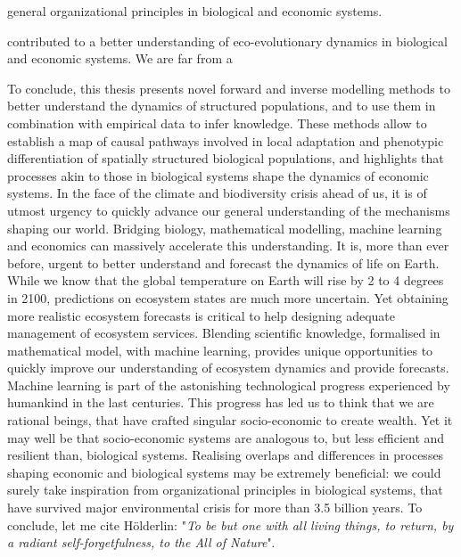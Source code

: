 general organizational principles in biological and economic systems.


contributed to a better understanding of eco-evolutionary dynamics in biological and economic systems.
% 
We are far from a 

To conclude, this thesis presents novel forward and inverse modelling methods to better understand the dynamics of structured populations, and to use them in combination with empirical data to infer knowledge. These methods allow to establish a map of causal pathways involved in local adaptation and phenotypic differentiation of spatially structured biological populations, and highlights that processes akin to those in biological systems shape the dynamics of economic systems. 
% 
In the face of the climate and biodiversity crisis ahead of us, it is of utmost urgency to quickly advance our general understanding of the mechanisms shaping our world.
% 
Bridging biology, mathematical modelling, machine learning and economics can massively accelerate this understanding.
It is, more than ever before, urgent to better understand and forecast the dynamics of life on Earth.
% 
While we know that the global temperature on Earth will rise by 2 to 4 degrees in 2100, predictions on ecosystem states are much more uncertain. Yet obtaining more realistic ecosystem forecasts is critical to help designing adequate management of ecosystem services.
% 
Blending scientific knowledge, formalised in mathematical model, with machine learning, provides unique opportunities to quickly improve our understanding of ecosystem dynamics and provide forecasts. %
% 
Machine learning is part of the astonishing technological progress experienced by humankind in the last centuries. This progress has led us to think that we are rational beings, that have crafted singular socio-economic to create wealth. Yet it may well be that socio-economic systems are analogous to, but less efficient and resilient than, biological systems. 
% 
Realising overlaps and differences in processes shaping economic and biological systems may be extremely beneficial: we could surely take inspiration from organizational principles in biological systems, that have survived major environmental crisis for more than 3.5 billion years.
% 
To conclude, let me cite Hölderlin: "\textit{To be but one with all living things, to return, by a radiant self-forgetfulness, to the All of Nature}". 





